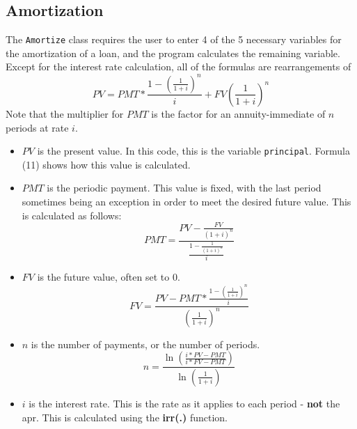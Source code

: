 \documentclass[10pt]{article}
\begin{document}
\subsection{Amortization}
The \texttt{Amortize} class requires the user to enter 4 of the 5 necessary variables for the amortization
of a loan, and the program calculates the remaining variable. Except for the interest rate calculation, all
of the formulas are rearrangements of\\
\begin{equation}
    PV = PMT*\frac{1-(\frac{1}{1+i})^n}{i} + FV\left(\frac{1}{1+i}\right)^n
\end{equation}
Note that the multiplier for $PMT$ is the factor for an annuity-immediate of $n$ periods at rate $i$.
\begin{itemize}
    \item $PV$ is the present value. In this code, this is the variable \texttt{principal}. Formula (11)
        shows how this value is calculated.
    \item $PMT$ is the periodic payment. This value is fixed, with the last period sometimes being an
        exception in order to meet the desired future value. This is calculated as follows:
        \begin{equation}
            PMT = \frac{PV-\frac{FV}{(1+i)^n}}{\frac{1-\frac{1}{(1+i)^n}}{i}}
        \end{equation}
    \item $FV$ is the future value, often set to 0.
        \begin{equation}
            FV = \frac{PV-PMT*\frac{1-(\frac{1}{1+i})^n}{i}}{\left(\frac{1}{1+i}\right)^n}
        \end{equation}
    \item $n$ is the number of payments, or the number of periods.
        \begin{equation}
            n = \frac{\ln(\frac{i*PV-PMT}{i*FV-PMT})}{\ln(\frac{1}{1+i})}
        \end{equation}
    \item $i$ is the interest rate. This is the rate as it applies to each period - \textbf{not}
        the apr. This is calculated using the \textbf{irr(.)} function.
\end{itemize}
\end{document}
